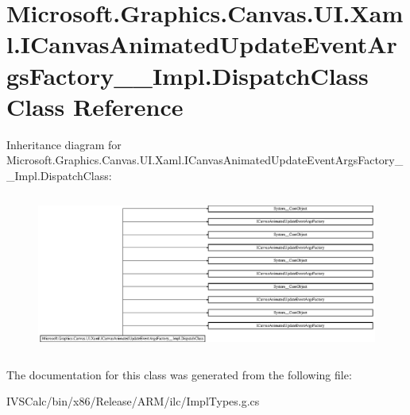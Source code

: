 \hypertarget{class_microsoft_1_1_graphics_1_1_canvas_1_1_u_i_1_1_xaml_1_1_i_canvas_animated_update_event_args1768fde48d5dd43b658fd7d349ade3bb}{}\section{Microsoft.\+Graphics.\+Canvas.\+U\+I.\+Xaml.\+I\+Canvas\+Animated\+Update\+Event\+Args\+Factory\+\_\+\+\_\+\+Impl.\+Dispatch\+Class Class Reference}
\label{class_microsoft_1_1_graphics_1_1_canvas_1_1_u_i_1_1_xaml_1_1_i_canvas_animated_update_event_args1768fde48d5dd43b658fd7d349ade3bb}
Inheritance diagram for Microsoft.\+Graphics.\+Canvas.\+U\+I.\+Xaml.\+I\+Canvas\+Animated\+Update\+Event\+Args\+Factory\+\_\+\+\_\+\+Impl.\+Dispatch\+Class\+:\begin{figure}[H]
\begin{center}
\leavevmode
\includegraphics[height=5.255973cm]{class_microsoft_1_1_graphics_1_1_canvas_1_1_u_i_1_1_xaml_1_1_i_canvas_animated_update_event_args1768fde48d5dd43b658fd7d349ade3bb}
\end{center}
\end{figure}


The documentation for this class was generated from the following file\+:\begin{DoxyCompactItemize}
\item 
I\+V\+S\+Calc/bin/x86/\+Release/\+A\+R\+M/ilc/Impl\+Types.\+g.\+cs\end{DoxyCompactItemize}
